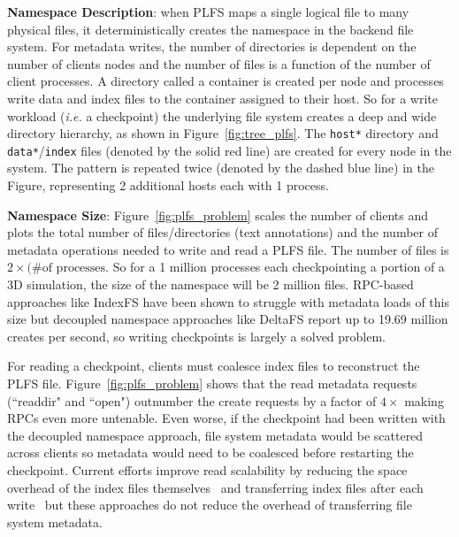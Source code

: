 

\textbf{Namespace Description}: when PLFS maps a single logical file to many
physical files, it deterministically creates the namespace in the backend file
system.  For metadata writes, the number of directories is dependent on the
number of clients nodes and the number of files is a function of the number of
client processes.  A directory called a container is created per node and
processes write data and index files to the container assigned to their host.
So for a write workload ({\it i.e.} a checkpoint) the underlying file system
creates a deep and wide directory hierarchy, as shown in
Figure~\ref{fig:tree_plfs}.  The \texttt{host*} directory and
\texttt{data*}/\texttt{index} files (denoted by the solid red line) are created
for every node in the system. The pattern is repeated twice (denoted by the
dashed blue line) in the Figure, representing 2 additional hosts each with 1
process.

\textbf{Namespace Size}: Figure~\ref{fig:plfs_problem} scales the number of
clients and plots the total number of files/directories (text annotations) and
the number of metadata operations needed to write and read a PLFS file.  The
number of files is \(2\times(\text{\# of processes}\).  So for a 1 million processes
each checkpointing a portion of a 3D simulation, the size of the namespace will
be 2 million files.  RPC-based approaches like IndexFS have been shown to
struggle with metadata loads of this size but decoupled namespace approaches
like DeltaFS report up to 19.69 million creates per second, so writing
checkpoints is largely a solved problem.

For reading a checkpoint, clients must coalesce index files to reconstruct the
PLFS file. Figure~\ref{fig:plfs_problem} shows that the read metadata requests
(``readdir" and ``open") outnumber the create requests by a factor of
\(4\times\) making RPCs even more untenable. Even worse, if the checkpoint had
been written with the decoupled namespace approach, file system metadata would
be scattered across clients so metadata would need to be coalesced before
restarting the checkpoint.  Current efforts improve read scalability by
reducing the space overhead of the index files
themselves~\cite{he:hpdc13-plfs-patterns} and transferring index files after
each write~\cite{grider:pc17-diddlings} but these approaches do not reduce the
overhead of transferring file system metadata.

